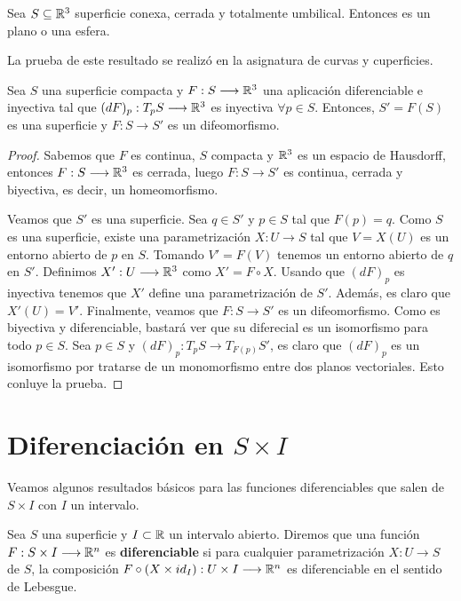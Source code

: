 \begin{theorem}\label{umbilicaltheorem}
Sea $S \subseteq \mathbb{R}^3$ superficie conexa, cerrada y totalmente umbilical. Entonces es un plano o una esfera.
\end{theorem}

La prueba de este resultado se realizó en la asignatura de curvas y cuperficies.

\begin{lemma}
Sea $S$ una superficie compacta y $F: S \longrightarrow \mathbb{R}^3$ una aplicación diferenciable e inyectiva tal que $(dF)_p: T_pS \longrightarrow \mathbb{R}^3$ es inyectiva $\forall p \in S$. Entonces, $S' = F(S)$ es una superficie y $F: S \longrightarrow S'$ es un difeomorfismo. 
\end{lemma}
\begin{proof}
Sabemos que $F$ es continua, $S$ compacta y $\mathbb{R}^3$ es un espacio de Hausdorff, entonces $F: S \longrightarrow \mathbb{R}^3$ es cerrada, luego $F: S \longrightarrow S'$ es continua, cerrada y biyectiva, es decir, un homeomorfismo.

Veamos que $S'$ es una superficie. Sea $q \in S'$ y $p \in S$ tal que $F(p)=q$. Como $S$ es una superficie, existe una parametrización $X: U \longrightarrow S$ tal que $V = X(U)$ es un entorno abierto de $p$ en $S$. Tomando $V'=F(V)$ tenemos un entorno abierto de $q$ en $S'$. Definimos $X': U \longrightarrow \mathbb{R}^3$ como $X'=F \circ X$. Usando que $(dF)_p$ es inyectiva tenemos que $X'$ define una parametrización de $S'$. Además, es claro que $X'(U) = V'$.
Finalmente, veamos que $F: S \longrightarrow S'$ es un difeomorfismo. Como es biyectiva y diferenciable, bastará ver que su diferecial es un isomorfismo para todo $p \in S$. Sea $p\in S$ y $(dF)_p: T_pS \longrightarrow T_{F(p)}S'$, es claro que $(dF)_p$ es un isomorfismo por tratarse de un monomorfismo entre dos planos vectoriales. Esto conluye la prueba.
\end{proof}

\section{Diferenciación en $S \times I$}

Veamos algunos resultados básicos para las funciones diferenciables que salen de $S \times I$ con $I$ un intervalo.

\begin{definition}
Sea $S$ una superficie y $I \subset \mathbb{R}$ un intervalo abierto. Diremos que una función $F: S \times I \longrightarrow \mathbb{R}^n$ es \textbf{diferenciable} si para cualquier parametrización $X: U \longrightarrow S$ de $S$, la composición $F \circ (X\times id_I): U \times I \longrightarrow \mathbb{R}^n$ es diferenciable en el sentido de Lebesgue.
\end{definition}

